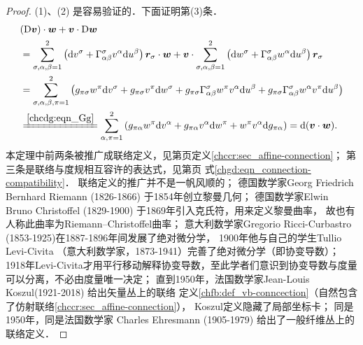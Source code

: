\begin{proof}
    (1)、(2) 是容易验证的．下面证明第(3)条．
    \begin{align*}
        & ({\rm D} \boldsymbol{v}) \cdot \boldsymbol{w} + \boldsymbol{v} \cdot {\rm D} \boldsymbol{w} \\
        &=  \sum_{\sigma,\alpha,\beta=1}^{2} \left(\mathrm{d} v^\sigma  
        +  \Gamma_{\alpha \beta}^\sigma v^\alpha \mathrm{d} u^\beta  \right) \boldsymbol{r}_\sigma 
         \cdot \boldsymbol{w} + \boldsymbol{v} \cdot 
           \sum_{\sigma,\alpha,\beta=1}^{2} \left(\mathrm{d} w^\sigma  
           +  \Gamma_{\alpha \beta}^\sigma w^\alpha \mathrm{d} u^\beta  \right) \boldsymbol{r}_\sigma \\
         &= \sum_{\sigma,\alpha,\beta,\pi=1}^{2} \left( g_{\pi \sigma} w^\pi  \mathrm{d} v^\sigma  
          +  g_{\pi \sigma} v^\pi  \mathrm{d} w^\sigma  
          +  g_{\pi \sigma} \Gamma_{\alpha \beta}^\sigma w^\pi v^\alpha \mathrm{d} u^\beta 
          +  g_{\pi \sigma} \Gamma_{\alpha \beta}^\sigma w^\alpha v^\pi \mathrm{d} u^\beta  \right)  \\  
         &\xlongequal{\ref{chcdg:eqn_Gg}}
         \sum_{\alpha,\pi=1}^{2} \left( g_{\pi \alpha} w^\pi  \mathrm{d} v^\alpha  
         +  g_{\pi \alpha} v^\alpha  \mathrm{d} w^\pi  
         +  w^\pi v^\alpha \mathrm{d} g_{\pi \alpha}   \right)  
         =\mathrm{d} (\boldsymbol{v} \cdot \boldsymbol{w}) .
    \end{align*} 
    本定理中前两条被推广成{\kaishu 联络}定义，见第\pageref{chccr:sec_affine-connection}页定义\ref{chccr:sec_affine-connection}；
第三条是联络与度规相互容许的表达式，见第\pageref{chgd:eqn_connection-compatibility}页
式\eqref{chgd:eqn_connection-compatibility}．
    联络定义的推广并不是一帆风顺的；
    德国数学家Georg Friedrich Bernhard Riemann (1826-1866) 于1854年创立黎曼几何；
    德国数学家Elwin Bruno Christoffel (1829-1900) 于1869年引入克氏符，用来定义黎曼曲率，
    故也有人称此曲率为Riemann--Christoffel曲率；
    意大利数学家Gregorio Ricci-Curbastro (1853-1925)在1887-1896年间发展了绝对微分学，
    1900年他与自己的学生Tullio Levi-Civita （意大利数学家，1873-1941）完善了绝对微分学（即协变导数）；
    1918年Levi-Civita才用平行移动解释协变导数，至此学者们意识到协变导数与度量可以分离，不必由度量唯一决定；
    直到1950年，法国数学家Jean-Louis Koszul(1921-2018) 给出矢量丛上的联络
    定义\ref{chfb:def_vb-conncection}（自然包含了仿射联络\ref{chccr:sec_affine-connection}），
    Koszul定义隐藏了局部坐标卡；
    同是1950年，同是法国数学家 Charles Ehresmann (1905-1979) 给出了一般纤维丛上的联络定义．
\end{proof}

